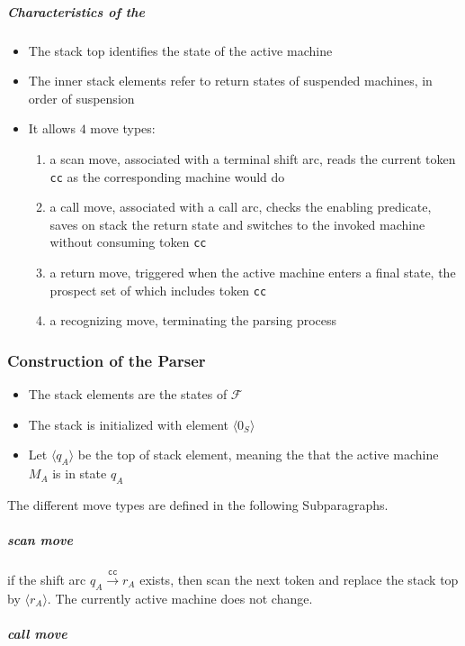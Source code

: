 \documentclass[english]{article}
\begin{document}
\subparagraph*{Characteristics of the \DPDA}
\begin{itemize}
  \item The stack top identifies the state of the active machine
  \item The inner stack elements refer to return states of suspended machines, in order of suspension
  \item It allows \(4\) move types:
        \begin{enumerate}
          \item a scan move, associated with a terminal shift arc, reads the current token \texttt{cc} as the corresponding machine would do
          \item a call move, associated with a call arc, checks the enabling predicate, saves on stack the return state and switches to the invoked machine without consuming token \texttt{cc}
          \item a return move, triggered when the active machine enters a final state, the prospect set of which includes token \texttt{cc}
          \item a recognizing move, terminating the parsing process
        \end{enumerate}
\end{itemize}

\subsubsection[Construction of the ELL(1) Parser]{Construction of the \ello Parser}

\begin{itemize}
  \item The stack elements are the states of \PCFG \(\mathcal{F}\)
  \item The stack is initialized with element \(\langle 0_S \rangle\)
  \item Let \(\langle q_A \rangle\) be the top of stack element, meaning the that the active machine \(M_A\) is in state \(q_A\)
\end{itemize}

The different move types are defined in the following Subparagraphs.

\subparagraph*{scan move}

if the shift arc \(q_A \xrightarrow{\texttt{cc}} r_A\) exists, then scan the next token and replace the stack top by \(\langle r_A\rangle\).
The currently active machine does not change.

\subparagraph*{call move}
\end{document}
